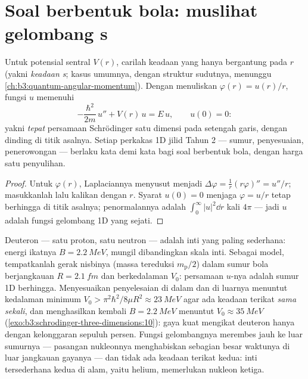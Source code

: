 \section{Soal berbentuk bola: muslihat gelombang s}

\begin{proposition}\label{prop:b3:schrodinger-three-dimensions:swave}
Untuk potensial sentral $V(r)$, carilah keadaan yang hanya bergantung
pada $r$ (yakni \emph{keadaan s}; kasus umumnya, dengan struktur
sudutnya, menunggu \cref{ch:b3:quantum-angular-momentum}). Dengan
menuliskan $\varphi(r) = u(r)/r$, fungsi $u$ memenuhi
\[
-\frac{\hbar^2}{2m}\,u'' + V(r)\,u = E\,u ,
\qquad u(0) = 0 :
\]
yakni \emph{tepat} persamaan Schrödinger satu dimensi pada setengah
garis, dengan dinding di titik asalnya. Setiap perkakas 1D jilid Tahun 2
--- sumur, penyesuaian, penerowongan --- berlaku kata demi kata bagi
soal berbentuk bola, dengan harga satu penyulihan.
\end{proposition}

\begin{proof}
Untuk $\varphi(r)$, Laplaciannya menyusut menjadi $\Delta\varphi =
\tfrac1r(r\varphi)'' = u''/r$; masukkanlah lalu kalikan dengan $r$.
Syarat $u(0) = 0$ menjaga $\varphi = u/r$ tetap berhingga di titik
asalnya; penormalannya adalah $\int_0^\infty|u|^2\dd r$ kali $4\pi$ ---
jadi $u$ adalah fungsi gelombang 1D yang sejati.
\end{proof}

\begin{example}\label{ex:b3:schrodinger-three-dimensions:deuteron}
Deuteron --- satu proton, satu neutron --- adalah inti yang paling
sederhana: energi ikatnya $B = \qty{2.2}{MeV}$, mungil dibandingkan
skala inti. Sebagai model, tempatkanlah gerak nisbinya (massa tereduksi
$m_{\text{p}}/2$) dalam sumur bola berjangkauan $R = \qty{2.1}{fm}$ dan
berkedalaman $V_0$: persamaan $u$-nya adalah sumur 1D berhingga.
Menyesuaikan penyelesaian di dalam dan di luarnya menuntut kedalaman
minimum $V_0 > \pi^2\hbar^2/8\mu R^2
\approx \qty{23}{MeV}$ agar ada keadaan terikat \emph{sama sekali}, dan
menghasilkan kembali $B = \qty{2.2}{MeV}$ menuntut $V_0 \approx \qty{35}{MeV}$
(\cref{exo:b3:schrodinger-three-dimensions:10}): gaya kuat mengikat
deuteron hanya dengan kelonggaran sepuluh persen. Fungsi gelombangnya
merembes jauh ke luar sumurnya --- pasangan nukleonnya menghabiskan
sebagian besar waktunya di luar jangkauan gayanya --- dan tidak ada
keadaan terikat kedua: inti tersederhana kedua di alam, yaitu helium,
memerlukan nukleon ketiga.
\end{example}

